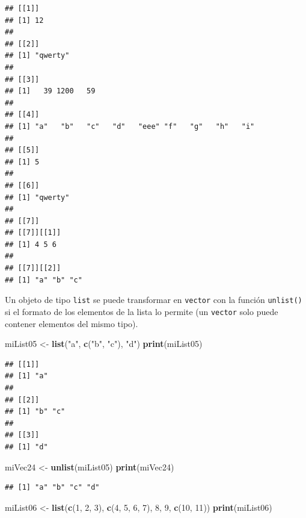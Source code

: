 \documentclass[]{book}
\newenvironment{Shaded}{\begin{snugshade}}{\end{snugshade}}
\newcommand{\KeywordTok}[1]{\textcolor[rgb]{0.13,0.29,0.53}{\textbf{#1}}}
\newcommand{\DecValTok}[1]{\textcolor[rgb]{0.00,0.00,0.81}{#1}}
\newcommand{\StringTok}[1]{\textcolor[rgb]{0.31,0.60,0.02}{#1}}
\newcommand{\NormalTok}[1]{#1}
\begin{document}
\begin{verbatim}
## [[1]]
## [1] 12
## 
## [[2]]
## [1] "qwerty"
## 
## [[3]]
## [1]   39 1200   59
## 
## [[4]]
## [1] "a"   "b"   "c"   "d"   "eee" "f"   "g"   "h"   "i"  
## 
## [[5]]
## [1] 5
## 
## [[6]]
## [1] "qwerty"
## 
## [[7]]
## [[7]][[1]]
## [1] 4 5 6
## 
## [[7]][[2]]
## [1] "a" "b" "c"
\end{verbatim}

Un objeto de tipo \texttt{list} se puede transformar en \texttt{vector}
con la función \texttt{unlist()} si el formato de los elementos de la
lista lo permite (un \texttt{vector} solo puede contener elementos del
mismo tipo).

\begin{Shaded}
\begin{Highlighting}[]
\NormalTok{miList05 <-}\StringTok{ }\KeywordTok{list}\NormalTok{(}\StringTok{"a"}\NormalTok{, }\KeywordTok{c}\NormalTok{(}\StringTok{"b"}\NormalTok{, }\StringTok{"c"}\NormalTok{), }\StringTok{"d"}\NormalTok{)}
\KeywordTok{print}\NormalTok{(miList05)}
\end{Highlighting}
\end{Shaded}

\begin{verbatim}
## [[1]]
## [1] "a"
## 
## [[2]]
## [1] "b" "c"
## 
## [[3]]
## [1] "d"
\end{verbatim}

\begin{Shaded}
\begin{Highlighting}[]
\NormalTok{miVec24 <-}\StringTok{ }\KeywordTok{unlist}\NormalTok{(miList05)}
\KeywordTok{print}\NormalTok{(miVec24)}
\end{Highlighting}
\end{Shaded}

\begin{verbatim}
## [1] "a" "b" "c" "d"
\end{verbatim}

\begin{Shaded}
\begin{Highlighting}[]
\NormalTok{miList06 <-}\StringTok{ }\KeywordTok{list}\NormalTok{(}\KeywordTok{c}\NormalTok{(}\DecValTok{1}\NormalTok{, }\DecValTok{2}\NormalTok{, }\DecValTok{3}\NormalTok{), }\KeywordTok{c}\NormalTok{(}\DecValTok{4}\NormalTok{, }\DecValTok{5}\NormalTok{, }\DecValTok{6}\NormalTok{, }\DecValTok{7}\NormalTok{), }\DecValTok{8}\NormalTok{, }\DecValTok{9}\NormalTok{, }\KeywordTok{c}\NormalTok{(}\DecValTok{10}\NormalTok{, }\DecValTok{11}\NormalTok{))}
\KeywordTok{print}\NormalTok{(miList06)}
\end{Highlighting}
\end{Shaded}
\end{document}

